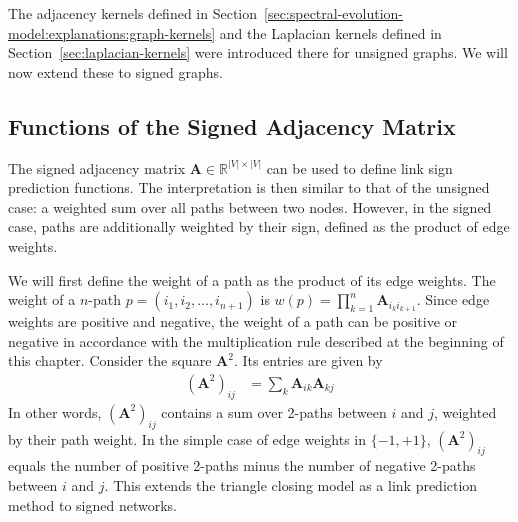 \documentclass[11pt,a4paper]{book}
\begin{document}

The adjacency kernels defined in
Section~\ref{sec:spectral-evolution-model:explanations:graph-kernels}
and the Laplacian kernels defined in
Section~\ref{sec:laplacian-kernels}
were introduced there for unsigned graphs.  We will now extend these to
signed graphs. 

\subsection{Functions of the Signed Adjacency Matrix}
The signed adjacency matrix $\mathbf A \in \mathbb R^{|V|\times
  |V|}$ can be used to define link sign prediction functions. 
The interpretation is then similar to that of the unsigned case:  a
weighted sum over all paths between two nodes.  However, in the signed
case, paths are additionally weighted by their sign, defined as the
product of edge weights.  

We will first define the weight of a path as the product of its edge
weights.  The weight of a $n$-path $p = (i_1, i_2, \ldots,
i_{n+1})$ is $w(p) = \prod_{k=1}^{n} \mathbf A_{i_k i_{k+1}}$.  Since edge
weights are positive and negative, the weight of a path can be positive
or negative in accordance with the multiplication rule described at the
beginning of this chapter. 
Consider the square $\mathbf A^2$.  Its entries are given by
\begin{align*}
  (\mathbf A^2)_{ij} &= \sum_k \mathbf A_{ik} \mathbf A_{kj}
\end{align*}
In other words, $(\mathbf A^2)_{ij}$ 
contains a sum over 2-paths
between $i$ and $j$, weighted by their path weight.  In the simple case
of edge weights in $\{-1, +1\}$, $(\mathbf A^2)_{ij}$ equals the number
of positive 2-paths minus the number of negative 2-paths between $i$ and
$j$.  This extends the triangle closing model as a link prediction method to
signed networks. 
\end{document}
